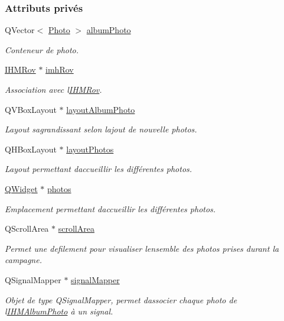 \subsubsection*{Attributs privés}
\begin{DoxyCompactItemize}
\item 
Q\+Vector$<$ \hyperlink{struct_photo}{Photo} $>$ \hyperlink{class_i_h_m_album_photo_a686adeccd626a94d9a4996782c851c61}{album\+Photo}
\begin{DoxyCompactList}\small\item\em Conteneur de photo. \end{DoxyCompactList}\item 
\hyperlink{class_i_h_m_rov}{I\+H\+M\+Rov} $\ast$ \hyperlink{class_i_h_m_album_photo_ab7056087d5ed3ee1528bd7f689b46c2a}{imh\+Rov}
\begin{DoxyCompactList}\small\item\em Association avec l\textquotesingle{}\hyperlink{class_i_h_m_rov}{I\+H\+M\+Rov}. \end{DoxyCompactList}\item 
Q\+V\+Box\+Layout $\ast$ \hyperlink{class_i_h_m_album_photo_a1b4028248430efc384e34b0151709fa0}{layout\+Album\+Photo}
\begin{DoxyCompactList}\small\item\em Layout s\textquotesingle{}agrandissant selon l\textquotesingle{}ajout de nouvelle photos. \end{DoxyCompactList}\item 
Q\+H\+Box\+Layout $\ast$ \hyperlink{class_i_h_m_album_photo_aabe492a016823fa63259c8e5d5b58e9d}{layout\+Photos}
\begin{DoxyCompactList}\small\item\em Layout permettant d\textquotesingle{}accueillir les différentes photos. \end{DoxyCompactList}\item 
\hyperlink{class_q_widget}{Q\+Widget} $\ast$ \hyperlink{class_i_h_m_album_photo_a0a58f758260250ac5520f2430d708d87}{photos}
\begin{DoxyCompactList}\small\item\em Emplacement permettant d\textquotesingle{}accueillir les différentes photos. \end{DoxyCompactList}\item 
Q\+Scroll\+Area $\ast$ \hyperlink{class_i_h_m_album_photo_a9ed730123be1c9ca6f7aa078ec9e0556}{scroll\+Area}
\begin{DoxyCompactList}\small\item\em Permet une defilement pour visualiser l\textquotesingle{}ensemble des photos prises durant la campagne. \end{DoxyCompactList}\item 
Q\+Signal\+Mapper $\ast$ \hyperlink{class_i_h_m_album_photo_a184d7d26edab19328980b55ce727811b}{signal\+Mapper}
\begin{DoxyCompactList}\small\item\em Objet de type Q\+Signal\+Mapper, permet d\textquotesingle{}associer chaque photo de l\textquotesingle{}\hyperlink{class_i_h_m_album_photo}{I\+H\+M\+Album\+Photo} à un signal. \end{DoxyCompactList}\end{DoxyCompactItemize}


